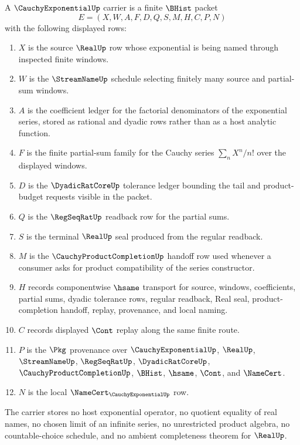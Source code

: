 \begin{definition}
\label{def:cauchy-exponential-carrier}
A $\CauchyExponentialUp$ carrier is a finite $\BHist$ packet
$$
E=(X,W,A,F,D,Q,S,M,H,C,P,N)
$$
with the following displayed rows:
\begin{enumerate}
\item $X$ is the source $\RealUp$ row whose exponential is being named through inspected finite windows.
\item $W$ is the $\StreamNameUp$ schedule selecting finitely many source and partial-sum windows.
\item $A$ is the coefficient ledger for the factorial denominators of the exponential series, stored as rational and dyadic rows rather than as a host analytic function.
\item $F$ is the finite partial-sum family for the Cauchy series $\sum_n X^n/n!$ over the displayed windows.
\item $D$ is the $\DyadicRatCoreUp$ tolerance ledger bounding the tail and product-budget requests visible in the packet.
\item $Q$ is the $\RegSeqRatUp$ readback row for the partial sums.
\item $S$ is the terminal $\RealUp$ seal produced from the regular readback.
\item $M$ is the $\CauchyProductCompletionUp$ handoff row used whenever a consumer asks for product compatibility of the series constructor.
\item $H$ records componentwise $\hsame$ transport for source, windows, coefficients, partial sums, dyadic tolerance rows, regular readback, Real seal, product-completion handoff, replay, provenance, and local naming.
\item $C$ records displayed $\Cont$ replay along the same finite route.
\item $P$ is the $\Pkg$ provenance over $\CauchyExponentialUp$, $\RealUp$, $\StreamNameUp$, $\RegSeqRatUp$, $\DyadicRatCoreUp$, $\CauchyProductCompletionUp$, $\BHist$, $\hsame$, $\Cont$, and $\NameCert$.
\item $N$ is the local $\NameCert_{\CauchyExponentialUp}$ row.
\end{enumerate}
The carrier stores no host exponential operator, no quotient equality of real names, no chosen limit of an infinite series, no unrestricted product algebra, no countable-choice schedule, and no ambient completeness theorem for $\RealUp$.
\end{definition}

